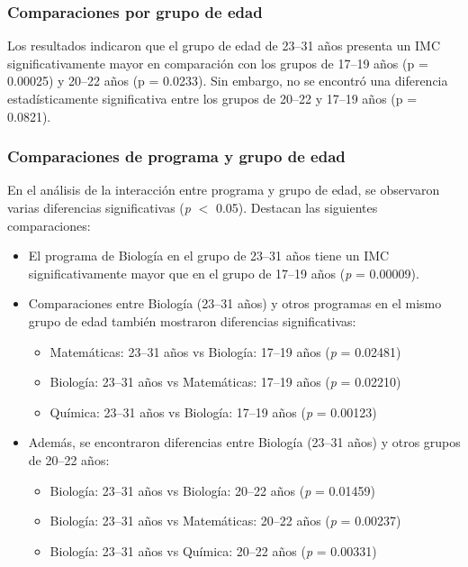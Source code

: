 \documentclass{rapport}
\begin{document}
\subsubsection{Comparaciones por grupo de edad}

Los resultados indicaron que el grupo de edad de 23--31 años presenta un IMC significativamente mayor en comparación con los grupos de 17--19 años (p = 0.00025) y 20--22 años (p = 0.0233). Sin embargo, no se encontró una diferencia estadísticamente significativa entre los grupos de 20--22 y 17--19 años (p = 0.0821).

\subsubsection{Comparaciones de programa y grupo de edad}

En el análisis de la interacción entre programa y grupo de edad, se observaron varias diferencias significativas (\textit{p} $<$ 0.05). Destacan las siguientes comparaciones:

\begin{itemize}
    \item El programa de Biología en el grupo de 23--31 años tiene un IMC significativamente mayor que en el grupo de 17--19 años (\textit{p} = 0.00009).
    \item Comparaciones entre Biología (23--31 años) y otros programas en el mismo grupo de edad también mostraron diferencias significativas:
    \begin{itemize}
        \item Matemáticas: 23--31 años vs Biología: 17--19 años (\textit{p} = 0.02481)
        \item Biología: 23--31 años vs Matemáticas: 17--19 años (\textit{p} = 0.02210)
        \item Química: 23--31 años vs Biología: 17--19 años (\textit{p} = 0.00123)
    \end{itemize}
    \item Además, se encontraron diferencias entre Biología (23--31 años) y otros grupos de 20--22 años:
    \begin{itemize}
        \item Biología: 23--31 años vs Biología: 20--22 años (\textit{p} = 0.01459)
        \item Biología: 23--31 años vs Matemáticas: 20--22 años (\textit{p} = 0.00237)
        \item Biología: 23--31 años vs Química: 20--22 años (\textit{p} = 0.00331)
    \end{itemize}
\end{itemize}
\end{document}
